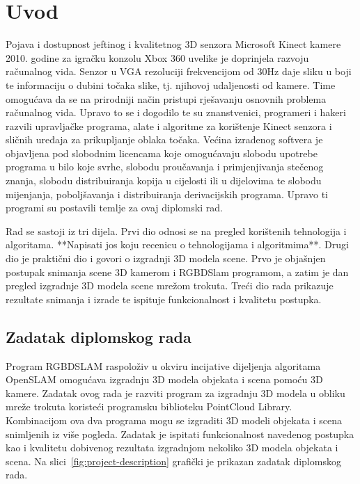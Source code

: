 \newpage

\setcounter{page}{1}
\setcounter{figure}{0}
\section{Uvod}%
\label{sec:Uvod}


Pojava i dostupnost jeftinog i kvalitetnog 3D senzora Microsoft Kinect
kamere 2010. godine za igračku konzolu Xbox 360 uvelike je doprinjela
razvoju računalnog vida. Senzor u VGA rezoluciji frekvencijom od 30Hz
daje sliku u boji te informaciju o dubini točaka slike, tj. njihovoj
udaljenosti od kamere. Time omogućava da se na prirodniji način pristupi
rješavanju osnovnih problema računalnog vida.  Upravo to se i dogodilo
te su znanstvenici, programeri i hakeri razvili upravljačke programa,
alate i algoritme za korištenje Kinect senzora i sličnih uređaja za
prikupljanje oblaka točaka. Većina izrađenog softvera je objavljena pod
slobodnim licencama koje omogućavaju slobodu upotrebe programa u bilo
koje svrhe, slobodu proučavanja i primjenjivanja stečenog znanja,
slobodu distribuiranja kopija u cijelosti ili u dijelovima te slobodu
mijenjanja, poboljšavanja i distribuiranja derivacijskih programa.
Upravo ti programi su postavili temlje za ovaj diplomski rad.

Rad se sastoji iz tri dijela. Prvi dio odnosi se na pregled korištenih
tehnologija i algoritama. **Napisati jos koju recenicu o tehnologijama i
algoritmima**. Drugi dio je praktični dio i govori o izgradnji 3D modela
scene. Prvo je objašnjen postupak snimanja scene 3D kamerom i RGBDSlam
programom, a zatim je dan pregled izgradnje 3D modela scene mrežom
trokuta. Treći dio rada prikazuje rezultate snimanja i izrade te ispituje
funkcionalnost i kvalitetu postupka.

\newpage
\subsection{Zadatak diplomskog rada} %
\label{sub:Zadatak diplomskog rada}

Program RGBDSLAM raspoloživ u okviru incijative dijeljenja algoritama
OpenSLAM omogućava izgradnju 3D modela objekata i scena pomoću 3D
kamere. Zadatak ovog rada je razviti program za izgradnju 3D modela u
obliku mreže trokuta koristeći programsku biblioteku PointCloud Library.
Kombinacijom ova dva programa mogu se izgraditi 3D modeli objekata i
scena snimljenih iz više pogleda. Zadatak je ispitati funkcionalnost
navedenog postupka kao i kvalitetu dobivenog rezultata izgradnjom
nekoliko 3D modela objekata i scena. Na
slici~\ref{fig:project-description} grafički je prikazan zadatak
diplomskog rada.

